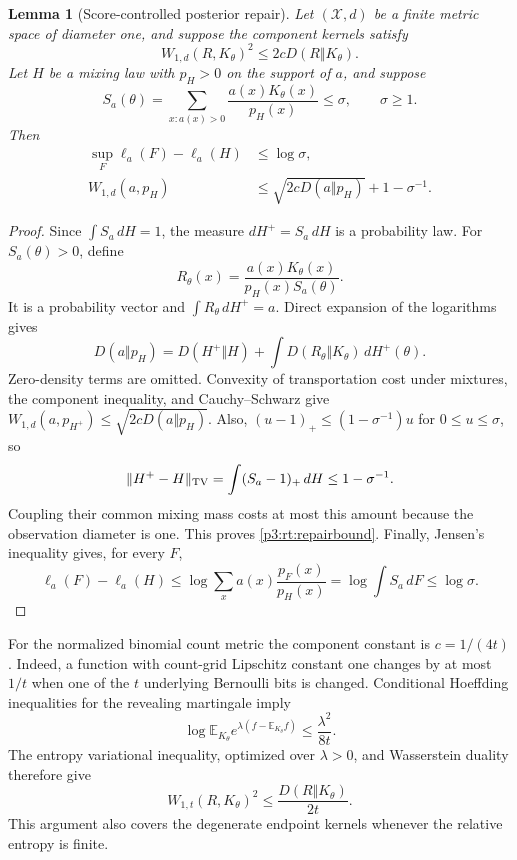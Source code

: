 \documentclass[11pt,a4paper]{article}
\newtheorem{lemma}[theorem]{Lemma}
\theoremstyle{definition}
\theoremstyle{remark}
\numberwithin{equation}{section}
\begin{document}
\begin{lemma}[Score-controlled posterior repair]\label{p3:rt:repair}
Let $(\mathcal X,d)$ be a finite metric space of diameter one, and
suppose the component kernels satisfy
\[
 W_{1,d}(R,K_\theta)^2\le2cD(R\Vert K_\theta).
\]
Let $H$ be a mixing law with $p_H>0$ on the support of $a$, and suppose
\[
 S_a(\theta)=\sum_{x:a(x)>0}\frac{a(x)K_\theta(x)}{p_H(x)}
                                    \le\sigma,\qquad\sigma\ge1.
\]
Then
\begin{align}
 \sup_F\ell_a(F)-\ell_a(H)&\le\log\sigma,
                                      \label{p3:rt:gap}\\
 W_{1,d}(a,p_H)&\le\sqrt{2cD(a\Vert p_H)}+1-\sigma^{-1}.
                                      \label{p3:rt:repairbound}
\end{align}
\end{lemma}
\begin{proof}
Since $\int S_a\,dH=1$, the measure $dH^+=S_a\,dH$ is a probability
law.  For $S_a(\theta)>0$, define
\[
 R_\theta(x)=\frac{a(x)K_\theta(x)}{p_H(x)S_a(\theta)}.
\]
It is a probability vector and $\int R_\theta\,dH^+=a$.  Direct
expansion of the logarithms gives
\begin{equation}\label{p3:rt:chain}
 D(a\Vert p_H)=D(H^+\Vert H)
                  +\int D(R_\theta\Vert K_\theta)\,dH^+(\theta).
\end{equation}
Zero-density terms are omitted.  Convexity of transportation cost
under mixtures, the component inequality, and Cauchy--Schwarz give
$W_{1,d}(a,p_{H^+})\le\sqrt{2cD(a\Vert p_H)}$.
Also, $(u-1)_+\le(1-\sigma^{-1})u$ for $0\le u\le\sigma$, so
\[
 \|H^+-H\|_{\rm TV}=\int(S_a-1)_+\,dH\le1-\sigma^{-1}.
\]
Coupling their common mixing mass costs at most this amount because
the observation diameter is one.  This proves \eqref{p3:rt:repairbound}.
Finally, Jensen's inequality gives, for every $F$,
\[
 \ell_a(F)-\ell_a(H)
 \le\log\sum_xa(x)\frac{p_F(x)}{p_H(x)}
 =\log\int S_a\,dF\le\log\sigma.
\]
\end{proof}

For the normalized binomial count metric the component constant is
$c=1/(4t)$.  Indeed, a function with count-grid Lipschitz constant
one changes by at most $1/t$ when one of the $t$ underlying Bernoulli
bits is changed.  Conditional Hoeffding inequalities for the revealing
martingale imply
\[
 \log\mathbb E_{K_\theta}
  e^{\lambda(f-\mathbb E_{K_\theta}f)}\le\frac{\lambda^2}{8t}.
\]
The entropy variational inequality, optimized over $\lambda>0$,
and Wasserstein duality therefore give
\begin{equation}\label{p3:rt:binT1}
 W_{1,t}(R,K_\theta)^2\le\frac{D(R\Vert K_\theta)}{2t}.
\end{equation}
This argument also covers the degenerate endpoint kernels whenever
the relative entropy is finite.
\end{document}
